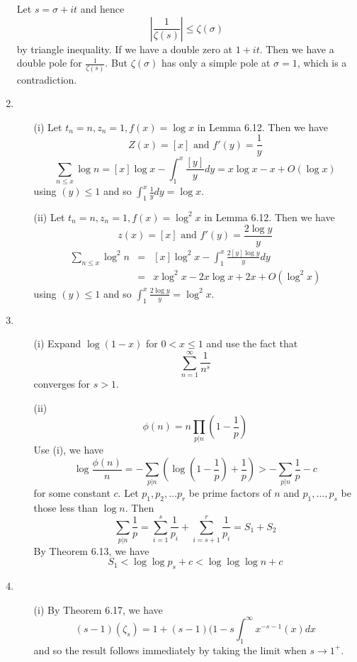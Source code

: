 \begin{enumerate}
Let $s=\sigma+it$ and hence $$\left|\frac{1}{\zeta(s)}\right| \le \zeta(\sigma)$$ by
triangle inequality. If we have a double zero at $1+it$. Then we have a double pole for $\frac{1}{\zeta(s)}$.
But $\zeta(\sigma)$ has only a simple pole at $\sigma=1$, which is a contradiction.
\item \begin{enumerate}
      \item[(i)] Let $t_n=n, z_n=1,f(x)=\log{x}$ in Lemma 6.12. Then we have
      $$Z(x)=[x] \text{ and } f'(y)=\frac{1}{y}$$
      $$\sum_{n \le x} \log{n}=[x]\log{x} - \int_1^x \frac{[y]}{y} dy=x\log{x}-x+O(\log{x})$$
      using $(y) \le 1$ and so $\int_1^x \frac{1}{y}dy=\log{x}$.\\
      \item[(ii)] Let $t_n=n, z_n=1, f(x)=\log^2{x}$ in Lemma 6.12. Then we have
      $$z(x)=[x] \text{ and } f'(y)=\frac{2\log{y}}{y}$$
      \begin{eqnarray*}
      \sum_{n \le x} \log^2{n}&=&[x]\log^2{x}-\int_1^x \frac{2[y]\log{y}}{y}dy\\
      &=& x\log^2{x}-2x\log{x}+2x+O(\log^2{x})
      \end{eqnarray*}
      using $(y) \le 1$ and so $\int_1^x \frac{2\log{y}}{y}=\log^2{x}$.
      \end{enumerate}
\item \begin{enumerate}
      \item[(i)] Expand $\log{(1-x)}$ for $0<x \le 1$ and use the fact that
      $$\sum_{n=1}^\infty \frac{1}{n^s}$$ converges for $s>1$.\\
      \item[(ii)]
      $$\phi(n)=n\prod_{p | n}\left(1-\frac{1}{p}\right)$$
      Use (i), we have
      $$\log{\frac{\phi(n)}{n}}
      =-\sum_{p |n}\left(\log{\left(1-\frac{1}{p}\right)}+\frac{1}{p}\right)
      >-\sum_{p |n}\frac{1}{p}-c$$ for some constant $c$.
      Let $p_1,p_2,\ldots p_r$ be prime factors of $n$ and $p_1,\ldots,p_s$ be those less than $\log{n}$.
      Then
      $$\sum_{p|n}\frac{1}{p}=\sum_{i=1}^s \frac{1}{p_i}+\sum_{i=s+1}^r \frac{1}{p_i}
      =S_1+S_2$$
      By Theorem 6.13, we have
      $$S_1 <\log{\log{p_s}}+c<\log{\log{\log{n}}}+c$$
      \end{enumerate}
\item \begin{enumerate}
\item[(i)] By Theorem 6.17, we have
$$(s-1)(\zeta_s)=1+(s-1)(1-s\int_1^\infty x^{-s-1}(x)dx$$
and so the result follows immediately by taking the limit when $s \to 1^+$.

\end{enumerate}
\end{enumerate}

